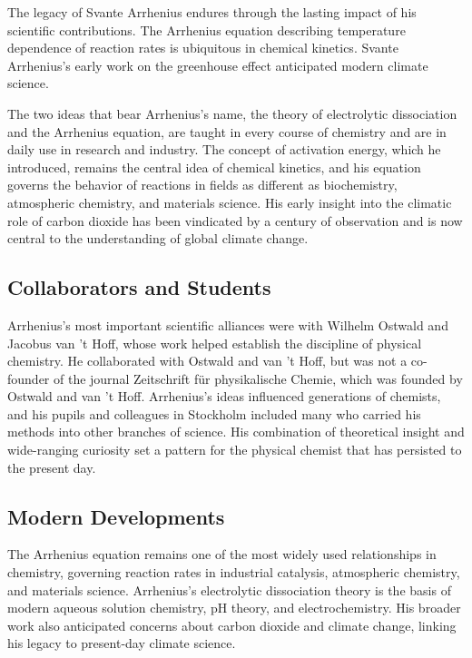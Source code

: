 The legacy of Svante Arrhenius endures through the lasting impact of his scientific contributions.
The Arrhenius equation describing temperature dependence of reaction rates is ubiquitous in chemical kinetics. Svante Arrhenius's early work on the greenhouse effect anticipated modern climate science.

The two ideas that bear Arrhenius's name, the theory of electrolytic dissociation and the Arrhenius equation, are taught in every course of chemistry and are in daily use in research and industry. The concept of activation energy, which he introduced, remains the central idea of chemical kinetics, and his equation governs the behavior of reactions in fields as different as biochemistry, atmospheric chemistry, and materials science. His early insight into the climatic role of carbon dioxide has been vindicated by a century of observation and is now central to the understanding of global climate change.

\subsection*{Collaborators and Students}

Arrhenius's most important scientific alliances were with Wilhelm Ostwald and Jacobus van 't Hoff, whose work helped establish the discipline of physical chemistry. He collaborated with Ostwald and van 't Hoff, but was not a co-founder of the journal Zeitschrift für physikalische Chemie, which was founded by Ostwald and van 't Hoff. Arrhenius's ideas influenced generations of chemists, and his pupils and colleagues in Stockholm included many who carried his methods into other branches of science. His combination of theoretical insight and wide-ranging curiosity set a pattern for the physical chemist that has persisted to the present day.

\subsection*{Modern Developments}

The Arrhenius equation remains one of the most widely used relationships in chemistry, governing reaction rates in industrial catalysis, atmospheric chemistry, and materials science. Arrhenius's electrolytic dissociation theory is the basis of modern aqueous solution chemistry, pH theory, and electrochemistry. His broader work also anticipated concerns about carbon dioxide and climate change, linking his legacy to present-day climate science.

